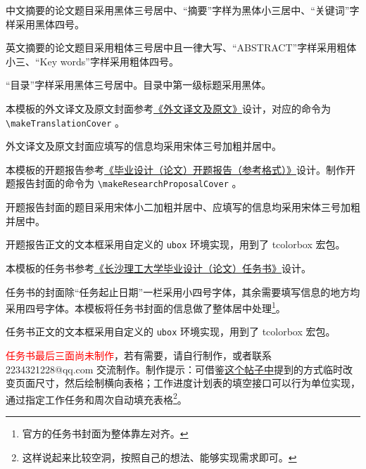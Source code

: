 中文摘要的论文题目采用黑体三号居中、“摘要”字样为黑体小三居中、“关键词”字样采用黑体四号。

英文摘要的论文题目采用粗体三号居中且一律大写、“ABSTRACT”字样采用粗体小三、“Key words”字样采用粗体四号。

“目录”字样采用黑体三号居中。目录中第一级标题采用黑体。


本模板的外文译文及原文封面参考\href{https://www.csust.edu.cn/jwc/info/1142/3598.htm}{《外文译文及原文》}设计，对应的命令为\\ \verb!\makeTranslationCover! 。

外文译文及原文封面应填写的信息均采用宋体三号加粗并居中。

本模板的开题报告参考\href{https://www.csust.edu.cn/jwc/info/1142/3599.htm}{《毕业设计（论文）开题报告（参考格式）》}设计。制作开题报告封面的命令为 \verb!\makeResearchProposalCover! 。

开题报告封面的题目采用宋体小二加粗并居中、应填写的信息均采用宋体三号加粗并居中。

开题报告正文的文本框采用自定义的 \verb!ubox! 环境实现，用到了 tcolorbox 宏包。


本模板的任务书参考\href{https://www.csust.edu.cn/jwc/info/1142/3600.htm}{《长沙理工大学毕业设计（论文）任务书》}设计。

任务书的封面除“任务起止日期”一栏采用小四号字体，其余需要填写信息的地方均采用四号字体。本模板将任务书封面的信息做了整体居中处理\footnote{官方的任务书封面为整体靠左对齐。}。

任务书正文的文本框采用自定义的 \verb!ubox! 环境实现，用到了 tcolorbox 宏包。

\textcolor{red}{任务书最后三面尚未制作}，若有需要，请自行制作，或者联系 2234321228@qq.com 交流制作。制作提示：可借鉴\href{https://stackoverflow.com/questions/2812892/change-paper-size-in-the-middle-of-a-latex-document}{这个帖子中}提到的方式临时改变页面尺寸，然后绘制横向表格；工作进度计划表的填空接口可以行为单位实现，通过指定工作任务和周次自动填充表格\footnote{这样说起来比较空洞，按照自己的想法、能够实现需求即可。}。

